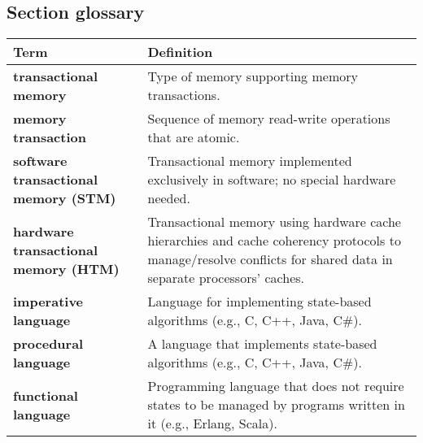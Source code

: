 \subsection{Section glossary}
\centering
\begin{tabular}{>{\raggedright}p{} >{\raggedright\arraybackslash}p{}}
\toprule
\textbf{Term} & \textbf{Definition} \\
\midrule
\textbf{transactional memory} & Type of memory supporting memory transactions. \\
\textbf{memory transaction} & Sequence of memory read-write operations that are atomic. \\
\textbf{software transactional memory (STM)} & Transactional memory implemented exclusively in software; no special hardware needed. \\
\textbf{hardware transactional memory (HTM)} & Transactional memory using hardware cache hierarchies and cache coherency protocols to manage/resolve conflicts for shared data in separate processors' caches. \\
\textbf{imperative language} & Language for implementing state-based algorithms (e.g., C, C++, Java, C\#). \\
\textbf{procedural language} & A language that implements state-based algorithms (e.g., C, C++, Java, C\#). \\
\textbf{functional language} & Programming language that does not require states to be managed by programs written in it (e.g., Erlang, Scala). \\
\bottomrule
\end{tabular}
\vspace{\baselineskip}

